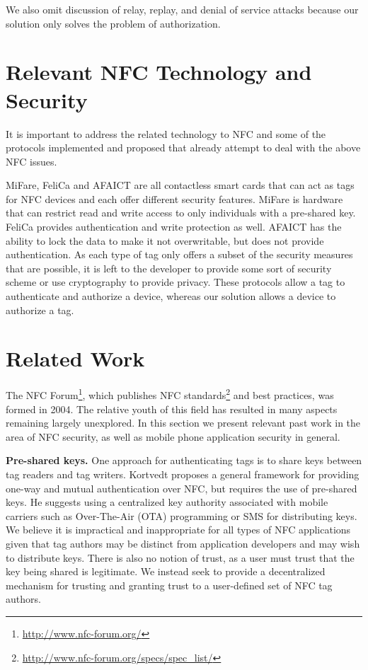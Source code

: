 \documentclass[12pt]{article}
\begin{document}
We also omit discussion of relay, replay, and denial of service attacks because our solution only solves the problem of authorization.

\section{Relevant NFC Technology and Security}
It is important to address the related technology to NFC and some of the protocols implemented and proposed that already attempt to deal with the above NFC issues. 

MiFare, FeliCa and AFAICT are all contactless smart cards that can act as tags for NFC devices and each offer different security features.
MiFare is hardware that can restrict read and write access to only individuals with a pre-shared key.
FeliCa provides authentication and write protection as well.
AFAICT has the ability to lock the data to make it not overwritable, but does not provide authentication.
As each type of tag only offers a subset of the security measures that are possible, it is left to the developer to provide some sort of security scheme or use cryptography to provide privacy. 
These protocols allow a tag to authenticate and authorize a device, whereas our solution allows a device to authorize a tag.


\section{Related Work}
The NFC Forum\footnote{\url{http://www.nfc-forum.org/}}, which publishes NFC standards\footnote{\url{http://www.nfc-forum.org/specs/spec_list/}} and best practices, was formed in 2004.
The relative youth of this field has resulted in many aspects remaining largely unexplored.
In this section we present relevant past work in the area of NFC security, as well as mobile phone application security in general.

\textbf{Pre-shared keys.}
One approach for authenticating tags is to share keys between tag readers and tag writers.
Kortvedt \cite{kortvedt2009} proposes a general framework for providing one-way and mutual authentication over NFC, but requires the use of pre-shared keys.
He suggests using a centralized key authority associated with mobile carriers such as Over-The-Air (OTA) programming or SMS for distributing keys.
We believe it is impractical and inappropriate for all types of NFC applications given that tag authors may be distinct from application developers and may wish to distribute keys.
There is also no notion of trust, as a user must trust that the key being shared is legitimate.
We instead seek to provide a decentralized mechanism for trusting and granting trust to a user-defined set of NFC tag authors.
\end{document}
